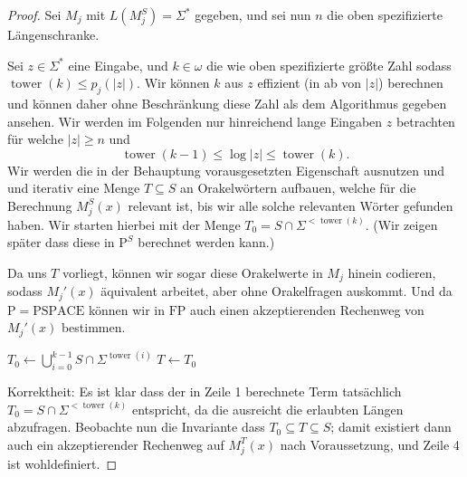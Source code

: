 \documentclass[nofonts]{uebung}
\theoremstyle{definition}
\def\P{\ensuremath{\mathrm{P}}}
\def\FP{\ensuremath{\mathrm{FP}}}
\def\PSPACE{\ensuremath{\mathrm{PSPACE}}}
\DeclareMathOperator{\tower}{tower}
\begin{document}
\begin{proof}
    Sei $M_j$ mit $L(M_j^S)=\Sigma^*$ gegeben, und sei nun $n$ die oben spezifizierte Längenschranke.

    Sei $z\in\Sigma^*$ eine Eingabe, und $k\in\omega$ die wie oben spezifizierte größte Zahl sodass $\tower(k)\leq p_j(|z|)$. Wir können $k$ aus $z$ effizient (in ab von $|z|$) berechnen und können daher ohne Beschränkung diese Zahl als dem Algorithmus gegeben ansehen.
    Wir werden im Folgenden nur hinreichend lange Eingaben $z$ betrachten für welche $|z|\geq n$ und 
    \[ \tower(k-1) \leq \log|z| \leq \tower(k). \]
    Wir werden die in der Behauptung vorausgesetzten  Eigenschaft ausnutzen und und iterativ eine Menge $T\subseteq S$ an Orakelwörtern aufbauen, welche für die Berechnung $M_j^S(x)$ relevant ist, bis wir alle solche relevanten Wörter gefunden haben. Wir starten hierbei mit der Menge $T_0=S\cap \Sigma^{<\tower(k)}$. (Wir zeigen später dass diese in $\P^S$ berechnet werden kann.)

    Da uns $T$ vorliegt, können wir sogar diese Orakelwerte in $M_j$ hinein codieren, sodass $M_j'(x)$ äquivalent arbeitet, aber ohne Orakelfragen auskommt. Und da $\P=\PSPACE$ können wir in $\FP$ auch einen akzeptierenden Rechenweg von $M_j'(x)$ bestimmen.

    \noindent
    \begin{algorithm}[H]
        $T_0\gets \bigcup_{i=0}^{k-1} S\cap\Sigma^{\tower(i)}$\;
        $T\gets T_0$\;
    \end{algorithm}

    Korrektheit: Es ist klar dass der in  Zeile 1 berechnete Term tatsächlich $T_0=S\cap\Sigma^{<\tower(k)}$ entspricht, da die ausreicht die erlaubten Längen abzufragen. Beobachte nun die Invariante dass $T_0\subseteq T\subseteq S$; damit existiert dann auch ein akzeptierender Rechenweg auf $M_j^{T}(x)$ nach Voraussetzung, und Zeile 4 ist wohldefiniert.


\end{proof}
\end{document}
